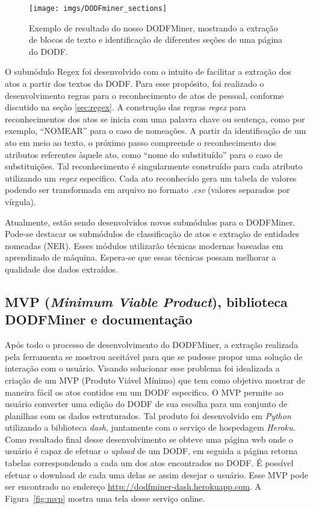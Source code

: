 \documentclass[12pt]{article}
\begin{document}
\begin{figure}
    \centering
    \texttt{[image: imgs/DODFminer\_sections]}
    \caption{Exemplo de resultado do nosso DODFMiner, mostrando a extração de blocos de texto e identificação de diferentes seções de uma página do DODF.}
    \label{fig:DODFminer_sections}
\end{figure}

O submódulo Regex foi desenvolvido com o intuito de facilitar a extração dos atos a partir dos textos do DODF. Para esse propósito, foi realizado o desenvolvimento regras para o reconhecimento de atos de pessoal, conforme discutido na seção \ref{sec:regex}. A construção das regras \textit{regex} para reconhecimentos dos atos se inicia com uma palavra chave ou sentença, como por exemplo, ``NOMEAR'' para o caso de nomeações. A partir da identificação de um ato em meio ao texto, o próximo passo compreende o reconhecimento dos atributos referentes àquele ato, como ``nome do substituído'' para o caso de substituições. Tal reconhecimento é singularmente construído para cada atributo utilizando um \textit{regex} especifico. Cada ato reconhecido gera um tabela de valores podendo ser transformada em arquivo no formato \textit{.csv} (valores separados por vírgula). 

Atualmente, estão sendo desenvolvidos novos submódulos para o DODFMiner. Pode-se destacar os submódulos de classificação de atos e extração de entidades nomeadas (NER). Esses módulos utilizarão técnicas modernas baseadas em aprendizado de máquina. Espera-se que essas técnicas possam melhorar a qualidade dos dados extraídos.

\subsection{MVP (\emph{Minimum Viable Product}), biblioteca DODFMiner e documentação}

Após todo o processo de desenvolvimento do DODFMiner, a extração realizada pela ferramenta se mostrou aceitável para que se pudesse propor uma solução de interação com o usuário. Visando solucionar esse problema foi idealizada a criação de um MVP (Produto Viável Mínimo) que tem como objetivo mostrar de maneira fácil os atos contidos em um DODF especifico. O MVP permite ao usuário converter uma edição do DODF de sua escolha para um conjunto de planilhas com os dados estruturados. Tal produto foi desenvolvido em \textit{Python} utilizando a biblioteca \textit{dash}, juntamente com o serviço de hospedagem \textit{Heroku}. Como resultado final desse desenvolvimento se obteve uma página web onde o usuário é capaz de efetuar o \textit{upload} de um DODF, em seguida a página retorna tabelas correspondendo a cada um dos atos encontrados no DODF. É possível efetuar o download de cada uma delas se assim desejar o usuário. Esse MVP pode ser encontrado no endereço \url{http://dodfminer-dash.herokuapp.com}.
A Figura~\ref{fig:mvp} mostra uma tela desse serviço online.
\end{document}
